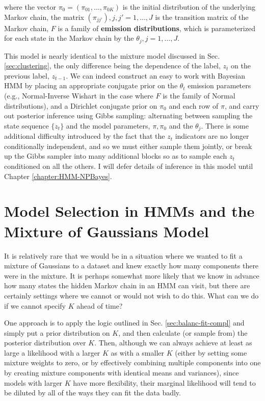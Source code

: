 where the vector $\pi_0 = (\pi_{01}, \dots, \pi_{0K})$ is the initial
distribution of the underlying Markov chain, the matrix $(\pi_{jj'}),
j,j' = 1, \dots, J$ is the transition matrix of the Markov chain, $F$
is a family of {\bf emission distributions}, which is parameterized
for each state in the Markov chain by the $\theta_j, j = 1, \dots, J$.

This model is nearly identical to the mixture model discussed in
Sec. \ref{sec:clustering}, the only difference being the dependence of
the label, $z_t$ on the previous label, $z_{t-1}$.  We can indeed
construct an easy to work with Bayesian HMM by placing an appropriate 
conjugate prior on the $\theta_t$ emission parameters (e.g.,
Normal-Inverse Wishart in the case where $F$ is the family of Normal
distributions), and a Dirichlet conjugate prior on $\pi_0$ and 
each row of $\pi$, and carry out posterior inference using Gibbs
sampling: alternating between sampling the state sequence $\{z_t\}$
and the model parameters, $\pi, \pi_0$ and the $\theta_j$.  There is
some additional difficulty introduced by the fact that the $z_t$
indicators are no longer conditionally independent, and so we must
either sample them jointly, or break up the Gibbs sampler into
many additional blocks so as to sample each $z_t$ conditioned on all
the others.  I will defer details of inference in this model until
Chapter \ref{chapter:HMM-NPBayes}.


\section{Model Selection in HMMs and the Mixture of Gaussians Model}
\label{sec:model-select-mixt}

It is relatively rare that we would be in a situation where we wanted
to fit a mixture of Gaussians to a dataset and knew exactly how many
components there were in the mixture.  It is perhaps somewhat more
likely that we know in advance how many
states the hidden Markov chain in an HMM can visit, but there are
certainly settings where we cannot or would not wish to do this. 
What can we do if we cannot specify $K$ ahead of time?

One approach is to apply the logic outlined in
Sec. \ref{sec:balanc-fit-compl} and simply put a prior distribution on
$K$, and then calculate (or sample from) the posterior distribution
over $K$.  Then, although we can always achieve at least as large a
likelihood with a larger $K$ as with a smaller $K$ (either by setting
some mixture weights to zero, or by effectively combining multiple
components into one by creating mixture components with
identical means and variances), since models with larger $K$ have more flexibility, their
marginal likelihood will tend to be diluted by all of the ways they can fit
the data badly.

